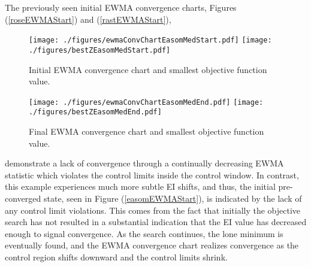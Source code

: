 \documentclass[12pt]{article}
\begin{document}
	The previously seen initial EWMA convergence charts, Figures (\ref{roseEWMAStart}) and (\ref{rastEWMAStart}),
	\begin{wrapfigure}{l}{0.5\textwidth}
	\texttt{[image: ./figures/ewmaConvChartEasomMedStart.pdf]}
	\texttt{[image: ./figures/bestZEasomMedStart.pdf]}
	\caption{Initial EWMA convergence chart and smallest objective function value. }
	\label{easomEWMAStart}
	$~$\\
	\texttt{[image: ./figures/ewmaConvChartEasomMedEnd.pdf]}
	\texttt{[image: ./figures/bestZEasomMedEnd.pdf]}
	\caption{Final EWMA convergence chart and smallest objective function value. }
	\label{easomEWMAEnd}
	\end{wrapfigure}
	demonstrate a
	lack of convergence through a continually decreasing EWMA statistic which violates the control limits inside the control window.
	In contrast, this example experiences much more subtle EI shifts, and thus, the initial pre-converged state, seen in Figure (\ref{easomEWMAStart}), is indicated by the lack of any control limit violations.
	This comes from the fact that initially the objective search has not resulted in a substantial indication that the EI value has decreased enough to signal convergence.
	As the search continues, the lone minimum is eventually found, and the EWMA convergence chart realizes convergence as the control region shifts downward and the control limits shrink. 
	
	
	
\end{document}
